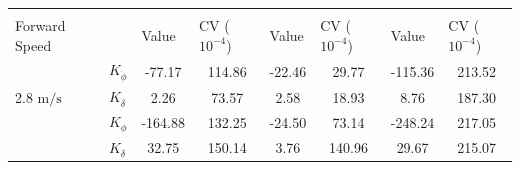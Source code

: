 \begin{table}[]
\begin{tabular}{llcccccc}
                                                   &                                                                    & \multicolumn{1}{l}{}                        & \multicolumn{1}{l}{}                                & \multicolumn{1}{l}{}                        & \multicolumn{1}{l}{}                                & \multicolumn{1}{l}{}                        & \multicolumn{1}{l}{}                                \\
    \multirow{-2}{*}{Forward Speed}                &                                                                    & \multicolumn{1}{l}{\multirow{-2}{*}{Value}} & \multicolumn{1}{l}{\multirow{-2}{*}{CV ($10^{-4}$)}} & \multicolumn{1}{l}{\multirow{-2}{*}{Value}} & \multicolumn{1}{l}{\multirow{-2}{*}{CV ($10^{-4}$)}} & \multicolumn{1}{l}{\multirow{-2}{*}{Value}} & \multicolumn{1}{l}{\multirow{-2}{*}{CV ($10^{-4}$)}} \\ \hline
                                                   & $K_{\dot{\phi}} $                                                  & -77.17                                      & 114.86                                              & -22.46                                      & 29.77                                               & -115.36                                     & 213.52                                              \\
    \multirow{-2}{*}{2.8 $\si{\meter\per\second}$} & $K_{\dot{\delta}}$                                                 & 2.26                                        & 73.57                                               & 2.58                                        & 18.93                                               & 8.76                                        & 187.30                                              \\
                                                   & $K_{\phi} $                                                        & -164.88                                     & 132.25                                              & -24.50                                      & 73.14                                               & -248.24                                     & 217.05                                              \\
                                                   & $K_\delta $                                                        & 32.75                                       & 150.14                                              & 3.76                                        & 140.96                                              & 29.67                                       & 215.07                                              \\

\end{tabular}
\end{table}
